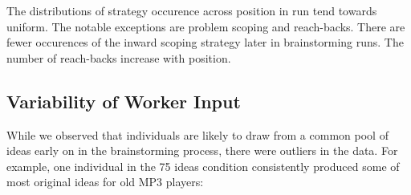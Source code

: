 The distributions of strategy occurence across position in run tend towards uniform. The notable exceptions are problem scoping and reach-backs. There are fewer occurences of the inward scoping strategy later in brainstorming runs.
The number of reach-backs increase with position. 





\subsection{Variability of Worker Input}
While we observed that individuals are likely to draw from a common pool of ideas early on in the brainstorming process, there were outliers in the data. For example, one individual in the 75 ideas condition consistently produced some of most original ideas for old MP3 players:

